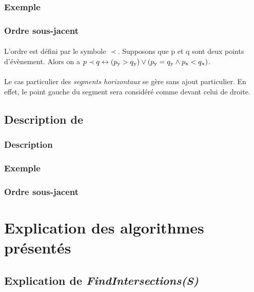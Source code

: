 \documentclass[]{article}
\begin{document}
        \subsubsection{Exemple}\label{subsub:QEx}
        
        \subsubsection{Ordre sous-jacent}\label{subsub:QOrd}
            \paragraph{} L'ordre est défini par le symbole $\prec$. Supposons que p et q sont deux points d'évènement. Alors on a $p \prec q \leftrightarrow (p\textsubscript{y} > q\textsubscript{y}) \vee (p\textsubscript{y} = q\textsubscript{y} \wedge p\textsubscript{x} < q\textsubscript{x})$.
            \paragraph{} Le cas particulier des \emph{segments horizontaux} se gère sans ajout particulier. En effet, le point gauche du segment sera considéré comme devant celui de droite.
        
    \subsection{Description de }\label{sub:mainTDesc}
        \subsubsection{Description}\label{subsub:TDesc}
        
        \subsubsection{Exemple}\label{subsub:TEx}
        
        \subsubsection{Ordre sous-jacent}\label{subsub:TOrd}

\section{Explication des algorithmes présentés}\label{sec:algos}
    \subsection{Explication de \emph{FindIntersections(S)}}\label{sub:findInter}
    
\end{document}
